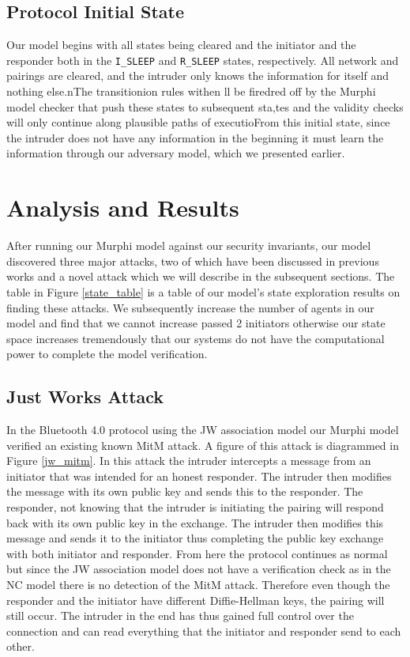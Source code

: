 \documentclass{acm_proc_article-sp}
\begin{document}
\subsection{Protocol Initial State}
Our model begins with all states being cleared and the initiator and the responder both in the \texttt{I\_SLEEP} and \texttt{R\_SLEEP} states, respectively. All network and pairings are cleared, and the intruder only knows the information for itself and nothing else.nThe transitionion rules withen ll be firedred off by the Murphi model checker that push these states to subsequent sta,tes and the validity checks will only continue along plausible paths of executioFrom this initial state, since the intruder does not have any information in the beginning it must learn the information through our adversary model, which we presented earlier.

\section{Analysis and Results}

After running our Murphi model against our security invariants, our model discovered three major attacks, two of which have been discussed in previous works and a novel attack which we will describe in the subsequent sections. The table in Figure \ref{state_table} is a table of our model's state exploration results on finding these attacks. We subsequently increase the number of agents in our model and find that we cannot increase passed 2 initiators otherwise our state space increases tremendously that our systems do not have the computational power to complete the model verification.

\subsection{Just Works Attack}
In the Bluetooth 4.0 protocol using the JW association model our Murphi model verified an existing known MitM attack. A figure of this attack is diagrammed in Figure \ref{jw_mitm}. In this attack the intruder intercepts a message from an initiator that was intended for an honest responder. The intruder then modifies the message with its own public key and sends this to the responder. The responder, not knowing that the intruder is initiating the pairing will respond back with its own public key in the exchange. The intruder then modifies this message and sends it to the initiator thus completing the public key exchange with both initiator and responder. From here the protocol continues as normal but since the JW association model does not have a verification check as in the NC model there is no detection of the MitM attack. Therefore even though the responder and the initiator have different Diffie-Hellman keys, the pairing will still occur. The intruder in the end has thus gained full control over the connection and can read everything that the initiator and responder send to each other.
\end{document}
